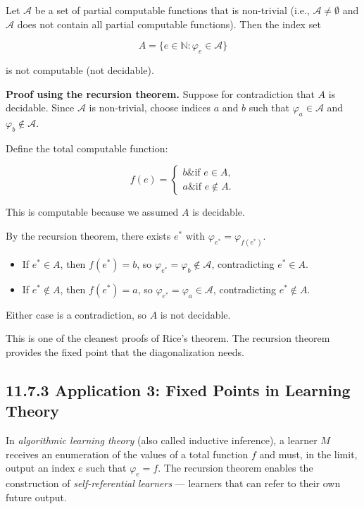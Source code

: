 \begin{theorem}[Rice 1953]
Let $\mathcal{A}$ be a set of partial computable functions that is non-trivial (i.e., $\mathcal{A} \neq \emptyset$ and $\mathcal{A}$ does not contain all partial computable functions). Then the index set

\[A = \{ e \in \mathbb{N} : \varphi_e \in \mathcal{A}\} \]

is not computable (not decidable).

\textbf{Proof using the recursion theorem.} Suppose for contradiction that $A$ is decidable. Since $\mathcal{A}$ is non-trivial, choose indices $a$ and $b$ such that $\varphi_a \in \mathcal{A}$ and $\varphi_b \notin \mathcal{A}$.

Define the total computable function:

\[f(e) = \begin{cases} b \& \text{if } e \in A, \\ a \& \text{if } e \notin A. \end{cases}\]

This is computable because we assumed $A$ is decidable.

By the recursion theorem, there exists $e^*$ with $\varphi_{e^*} = \varphi_{f(e^*)}$.

\begin{itemize}
\item If $e^* \in A$, then $f(e^*) = b$, so $\varphi_{e^*} = \varphi_b \notin \mathcal{A}$, contradicting $e^* \in A$.
\item If $e^* \notin A$, then $f(e^*) = a$, so $\varphi_{e^*} = \varphi_a \in \mathcal{A}$, contradicting $e^* \notin A$.
\end{itemize}

Either case is a contradiction, so $A$ is not decidable. 

This is one of the cleanest proofs of Rice's theorem. The recursion theorem provides the fixed point that the diagonalization needs.

\end{theorem}


\subsection{11.7.3 Application 3: Fixed Points in Learning Theory}

In \textit{algorithmic learning theory} (also called inductive inference), a learner $M$ receives an enumeration of the values of a total function $f$ and must, in the limit, output an index $e$ such that $\varphi_e = f$. The recursion theorem enables the construction of \textit{self-referential learners} --- learners that can refer to their own future output.

